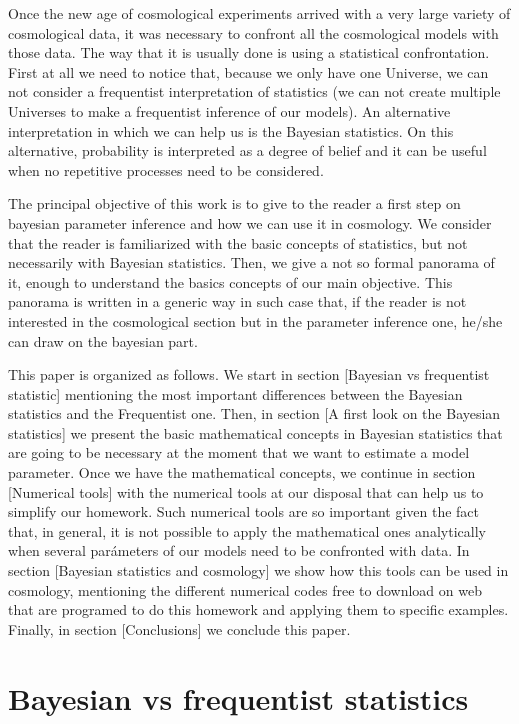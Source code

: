 \documentclass[onecolumn,           %
               showpacs,            %
               preprintnumbers,     %
               aps,                 %
               prl,          	    %
               letterpaper,             %
               superscriptaddress,      %
               nofootinbib,         %
               tightenlines,        %
               floats,floatfix      %
               ,usenatbib,
               ]{revtex4-1}
\begin{document}
Once the new age of cosmological experiments arrived with a very large variety of cosmological data, it was necessary to confront all the cosmological models with those data. The way that it is usually done is using a statistical confrontation. First at all we need to notice that, because we only have one Universe, we can not consider a frequentist interpretation of statistics (we can not create multiple Universes to make a frequentist inference of our models). An alternative interpretation in which we can help us is the Bayesian statistics. On this alternative, probability is interpreted as a degree of belief and it can be useful when no repetitive processes need to be considered.  

The principal objective of this work is to give to the reader a first step on bayesian parameter inference and how we can use it in cosmology. We consider that the reader is familiarized with the basic concepts of statistics, but not necessarily with Bayesian statistics. Then, we give a not so formal panorama of it, enough to understand the basics concepts of our main objective. This panorama is written in a generic way in  such case that, if the reader is not interested in the cosmological section but in the parameter inference one, he/she can draw on the bayesian part.  

This paper is organized as follows. We start in section [Bayesian vs frequentist statistic] mentioning the most important differences between the Bayesian statistics and the Frequentist one. Then, in section [A first look on the Bayesian statistics] we present the basic mathematical concepts in Bayesian statistics that are going to be necessary at the moment that we want to estimate a model parameter. Once we have the mathematical concepts, we continue in section [Numerical tools] with the numerical tools at our disposal that can help us to simplify our homework. Such numerical tools are so important given the fact that, in general, it is not possible to apply the mathematical ones analytically when several parámeters of our models need to be confronted with data. In section [Bayesian statistics and cosmology] we show how this tools can be used in cosmology, mentioning the different numerical codes free to download on web that are programed to do this homework and applying them to specific examples. Finally, in section [Conclusions] we conclude this paper.

\section{Bayesian vs frequentist statistics}
\end{document}
